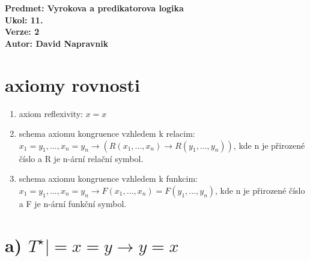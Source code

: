 \documentclass[a4paper]{article}
\begin{document}
\noindent
\textbf{Predmet: Vyrokova a predikatorova logika}\\
\textbf{Ukol: 11.}\\
\textbf{Verze: 2}\\
\textbf{Autor: David Napravnik}



\section*{axiomy rovnosti}
\renewcommand{\labelenumi}{\roman{enumi}}
\begin{enumerate}
    \item axiom reflexivity: 
        $x=x$
    \item schema axiomu kongruence vzhledem k relacim: $
        x_{1} = y_{1},...,x_{n}=y_{n}
        \rightarrow
        (R(x_{1},...,x_{n})
        \rightarrow
        R(y_{1},...,y_{n}))
        $, kde n je přirozené číslo a R je n-ární relační symbol.
    \item schema axiomu kongruence vzhledem k funkcim: $
        x_{1}=y_{1},...,x_{n}=y_{n}
        \rightarrow
        F(x_{1},...,x_{n})=F(y_{1},...,y_{n})
        $, kde n je přirozené číslo a F je n-ární funkční symbol.
\end{enumerate}


\section*{a)  $T^\star |= x = y \rightarrow y = x$}
\end{document}
